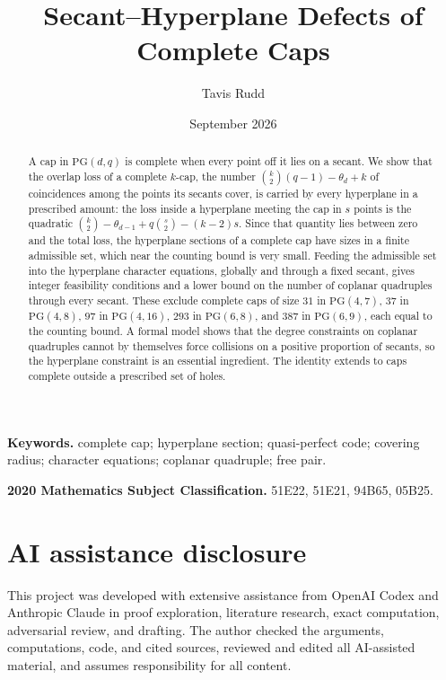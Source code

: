 \documentclass[11pt]{article}
\title{Secant--Hyperplane Defects of Complete Caps}
\author{Tavis Rudd}
\date{September 2026}
\numberwithin{equation}{section}
\theoremstyle{definition}
\theoremstyle{remark}
\newcommand{\PG}{\mathrm{PG}}
\begin{document}
\maketitle

\begin{abstract}
A cap in \(\PG(d,q)\) is complete when every point off it lies on a
secant.  We show that the overlap loss of a complete \(k\)-cap, the
number \(\binom{k}{2}(q-1)-\theta_d+k\) of coincidences among the points
its secants cover, is carried by every hyperplane in a prescribed
amount: the loss inside a hyperplane meeting the cap in \(s\) points is
the quadratic \(\binom{k}{2}-\theta_{d-1}+q\binom{s}{2}-(k-2)s\).  Since
that quantity lies between zero and the total loss, the hyperplane
sections of a complete cap have sizes in a finite admissible set, which
near the counting bound is very small.  Feeding the admissible set into
the hyperplane character equations, globally and through a fixed
secant, gives integer feasibility conditions and a lower bound on the
number of coplanar quadruples through every secant.  These exclude
complete caps of size \(31\) in \(\PG(4,7)\), \(37\) in \(\PG(4,8)\),
\(97\) in \(\PG(4,16)\), \(293\) in \(\PG(6,8)\), and \(387\) in
\(\PG(6,9)\), each equal to the counting bound.  A formal model shows
that the degree constraints on coplanar quadruples cannot by themselves
force collisions on a positive proportion of secants, so the hyperplane
constraint is an essential ingredient.  The identity extends to caps
complete outside a prescribed set of holes.
\end{abstract}

\noindent\textbf{Keywords.} complete cap; hyperplane section; quasi-perfect
code; covering radius; character equations; coplanar quadruple; free pair.

\smallskip
\noindent\textbf{2020 Mathematics Subject Classification.} 51E22, 51E21,
94B65, 05B25.











\section*{AI assistance disclosure}

This project was developed with extensive assistance from OpenAI Codex and
Anthropic Claude in proof exploration, literature research, exact computation,
adversarial review, and drafting.  The author checked the arguments,
computations, code, and cited sources, reviewed and edited all AI-assisted
material, and assumes responsibility for all content.

\footnotesize
\raggedright

\end{document}
